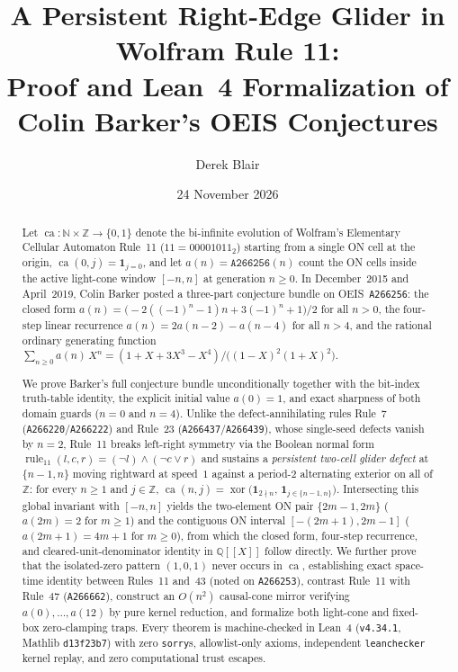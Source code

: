\documentclass[11pt]{article}
\title{A Persistent Right-Edge Glider in Wolfram Rule 11:\\[2pt]
\large Proof and Lean~4 Formalization of Colin Barker's OEIS \seq{A266256} Conjectures}
\author{Derek Blair}
\date{24 November 2026}
\newcommand{\llbracket}{[\![}
\newcommand{\rrbracket}{]\!]}
\theoremstyle{definition}
\newcommand{\N}{\mathbb{N}}
\newcommand{\Z}{\mathbb{Z}}
\newcommand{\Q}{\mathbb{Q}}
\newcommand{\seq}[1]{\texttt{#1}}
\newcommand{\ruleTT}{\operatorname{rule}_{11}}
\newcommand{\ca}{\operatorname{ca}}
\begin{document}
\maketitle

\begin{abstract}
Let $\ca : \N \times \Z \to \{0, 1\}$ denote the bi-infinite evolution of Wolfram's Elementary Cellular Automaton Rule~11 ($11 = 00001011_2$) starting from a single ON cell at the origin, $\ca(0, j) = \mathbf{1}_{j=0}$, and let $a(n) = \seq{A266256}(n)$ count the ON cells inside the active light-cone window $[-n, n]$ at generation $n \ge 0$. In December~2015 and April~2019, Colin Barker posted a three-part conjecture bundle on OEIS~\seq{A266256}: the closed form $a(n) = \bigl(-2((-1)^n - 1)n + 3(-1)^n + 1\bigr)/2$ for all $n > 0$, the four-step linear recurrence $a(n) = 2a(n-2) - a(n-4)$ for all $n > 4$, and the rational ordinary generating function $\sum_{n \ge 0} a(n)\,X^n = (1 + X + 3X^3 - X^4)/\bigl((1 - X)^2(1 + X)^2\bigr)$.

We prove Barker's full conjecture bundle unconditionally together with the bit-index truth-table identity, the explicit initial value $a(0) = 1$, and exact sharpness of both domain guards ($n = 0$ and $n = 4$). Unlike the defect-annihilating rules Rule~7 (\seq{A266220}/\seq{A266222}) and Rule~23 (\seq{A266437}/\seq{A266439}), whose single-seed defects vanish by $n = 2$, Rule~11 breaks left-right symmetry via the Boolean normal form $\ruleTT(l, c, r) = (\neg l) \land (\neg c \lor r)$ and sustains a \emph{persistent two-cell glider defect} at $\{n - 1, n\}$ moving rightward at speed~$1$ against a period-$2$ alternating exterior on all of $\Z$: for every $n \ge 1$ and $j \in \Z$, $\ca(n, j) = \operatorname{xor}\bigl(\mathbf{1}_{2 \nmid n},\, \mathbf{1}_{j \in \{n-1, n\}}\bigr)$. Intersecting this global invariant with $[-n, n]$ yields the two-element ON pair $\{2m - 1, 2m\}$ ($a(2m) = 2$ for $m \ge 1$) and the contiguous ON interval $[-(2m+1), 2m - 1]$ ($a(2m + 1) = 4m + 1$ for $m \ge 0$), from which the closed form, four-step recurrence, and cleared-unit-denominator identity in $\Q\llbracket X \rrbracket$ follow directly. We further prove that the isolated-zero pattern $(1, 0, 1)$ never occurs in $\ca$, establishing exact space-time identity between Rules~11 and~43 (noted on \seq{A266253}), contrast Rule~11 with Rule~47 (\seq{A266662}), construct an $O(n^2)$ causal-cone mirror verifying $a(0), \dots, a(12)$ by pure kernel reduction, and formalize both light-cone and fixed-box zero-clamping traps. Every theorem is machine-checked in Lean~4 (\texttt{v4.34.1}, Mathlib \texttt{d13f23b7}) with zero \texttt{sorry}s, allowlist-only axioms, independent \texttt{leanchecker} kernel replay, and zero computational trust escapes.
\end{abstract}
\end{document}

